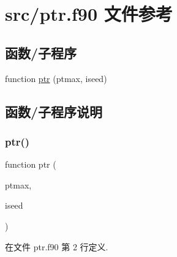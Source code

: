 \hypertarget{ptr_8f90}{}\section{src/ptr.f90 文件参考}
\label{ptr_8f90}
\subsection*{函数/子程序}
\begin{DoxyCompactItemize}
\item 
function \mbox{\hyperlink{ptr_8f90_aa9f8866324f11fd61fe214a333ef3c10}{ptr}} (ptmax, iseed)
\end{DoxyCompactItemize}


\subsection{函数/子程序说明}
\mbox{\label{ptr_8f90_aa9f8866324f11fd61fe214a333ef3c10}} 
\subsubsection{\texorpdfstring{ptr()}{ptr()}}
{\footnotesize\ttfamily function ptr (\begin{DoxyParamCaption}\item[{}]{ptmax,  }\item[{}]{iseed }\end{DoxyParamCaption})}



在文件 ptr.\+f90 第 2 行定义.

